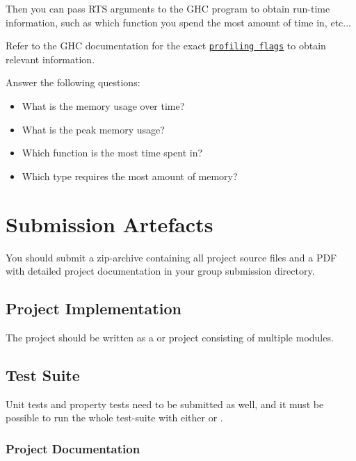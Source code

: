 \documentclass{article}
\begin{document}
Then you can pass RTS arguments to the GHC program to obtain run-time information, such as which function you spend the most amount of time in, etc...

Refer to the GHC documentation for the exact \href{https://downloads.haskell.org/ghc/latest/docs/html/users_guide/profiling.html#profiling-memory-usage}{\texttt{profiling flags}} to obtain relevant information.

Answer the following questions:

\begin{itemize}
\item What is the memory usage over time?
\item What is the peak memory usage?
\item Which function is the most time spent in?
\item Which type requires the most amount of memory?
\end{itemize}

\section{Submission Artefacts}
\label{sec:artefacts}

You should submit a zip-archive containing all project source files and a PDF with detailed project documentation in your group submission directory.

\subsection{Project Implementation}

The project should be written as a  or  project consisting of multiple modules.

\subsection{Test Suite}

Unit tests and property tests need to be submitted as well, and it must be possible to run the whole test-suite with either  or .

\subsubsection*{Project Documentation}
\end{document}
